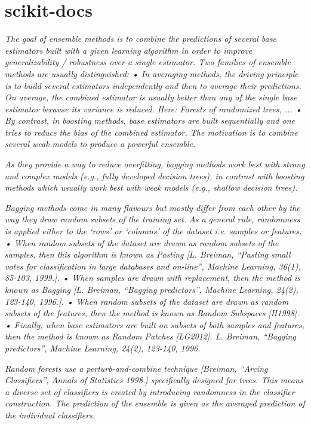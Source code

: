 \section{scikit-docs}

\textit{The goal of ensemble methods is to combine the predictions of several base estimators built with a given learning algorithm in order to improve generalizability / robustness over a single estimator.
Two families of ensemble methods are usually distinguished:
• In averaging methods, the driving principle is to build several estimators independently and then to average their predictions. On average, the combined estimator is usually better than any of the single base estimator because its variance is reduced.
Here: Forests of randomized trees, ...
• By contrast, in boosting methods, base estimators are built sequentially and one tries to reduce the bias of the combined estimator. The motivation is to combine several weak models to produce a powerful ensemble.}

\textit{As they provide a way to reduce overfitting, bagging methods work best with strong and complex models (e.g., fully developed decision trees), in contrast with boosting methods which usually work best with weak models (e.g., shallow decision trees).}

\textit{Bagging methods come in many flavours but mostly differ from each other by the way they draw random subsets of the training set. As a general rule, randomness is applied either to the ‘rows’ or ‘columns’ of the dataset i.e. samples or features:    
• When random subsets of the dataset are drawn as random subsets of the samples, then this algorithm is known as Pasting [L. Breiman, “Pasting small votes for classification in large databases and on-line”, Machine Learning, 36(1), 85-103, 1999.].
• When samples are drawn with replacement, then the method is known as Bagging [L. Breiman, “Bagging predictors”, Machine Learning, 24(2), 123-140, 1996.].
• When random subsets of the dataset are drawn as random subsets of the features, then the method is known as Random Subspaces [H1998].
• Finally, when base estimators are built on subsets of both samples and features, then the method is known as
Random Patches [LG2012].
L. Breiman, “Bagging predictors”, Machine Learning, 24(2), 123-140, 1996.}


\textit{Random forests use a perturb-and-combine technique [Breiman, “Arcing Classifiers”, Annals of Statistics 1998.] specifically designed for trees. This means a diverse set of classifiers is created by introducing randomness in the classifier construction. The prediction of the ensemble is given as the averaged prediction of the individual classifiers.}

